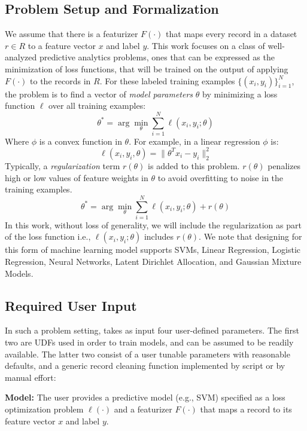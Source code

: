 \subsection{Problem Setup and Formalization}
We assume that there is a featurizer $F(\cdot)$ that maps every record in a dataset $r \in R$ to a feature vector $x$ and label $y$.
This work focuses on a class of well-analyzed predictive analytics problems, ones that can be expressed as the minimization of loss functions, that will be trained on the output of applying $F(\cdot)$ to the records in $R$.
For these labeled training examples $\{(x_{i},y_{i})\}_{i=1}^{N}$, the problem is to find a vector of \emph{model parameters} $\theta$ by minimizing a loss function $\ell$ over all training examples:
\[
 \theta^{*}=\arg\min_{\theta}\sum_{i=1}^{N}\ell(x_{i},y_{i};\theta)
\]
Where $\phi$ is a convex function in $\theta$.
For example, in a linear regression $\phi$ is:
\[
\ell(x_{i},y_{i},\theta) = \|\theta^Tx_{i} - y_i \|_2^2
\]
Typically, a \emph{regularization} term $r(\theta)$ is added to this problem.
$r(\theta)$ penalizes high or low values of feature weights in $\theta$ to avoid overfitting to noise in the training examples.
\begin{equation}
 \theta^{*}=\arg\min_{\theta}\sum_{i=1}^{N}\ell(x_{i},y_{i};\theta) + r(\theta)
 \label{ideal}
\end{equation}
In this work, without loss of generality, we will include the regularization as part of the loss function i.e., $\ell(x_{i},y_{i};\theta)$ includes $r(\theta)$.
We note that designing \sys for this form of machine learning model supports SVMs, Linear Regression, Logistic Regression, Neural Networks, Latent Dirichlet Allocation, and Gaussian Mixture Models.

\subsection{Required User Input}\label{uinp}
In such a problem setting, \sys takes as input four user-defined parameters.  The first two are UDFs used in order to train models, and can be assumed to be readily available.  
The latter two consist of a user tunable parameters with reasonable defaults,
and a generic record cleaning function implemented by script or by manual effort:

\noindent\textbf{Model:} The user provides a predictive model (e.g., SVM) specified as a loss optimization problem $\ell(\cdot)$ and a featurizer $F(\cdot)$ that maps a record to its feature vector $x$ and label $y$.


